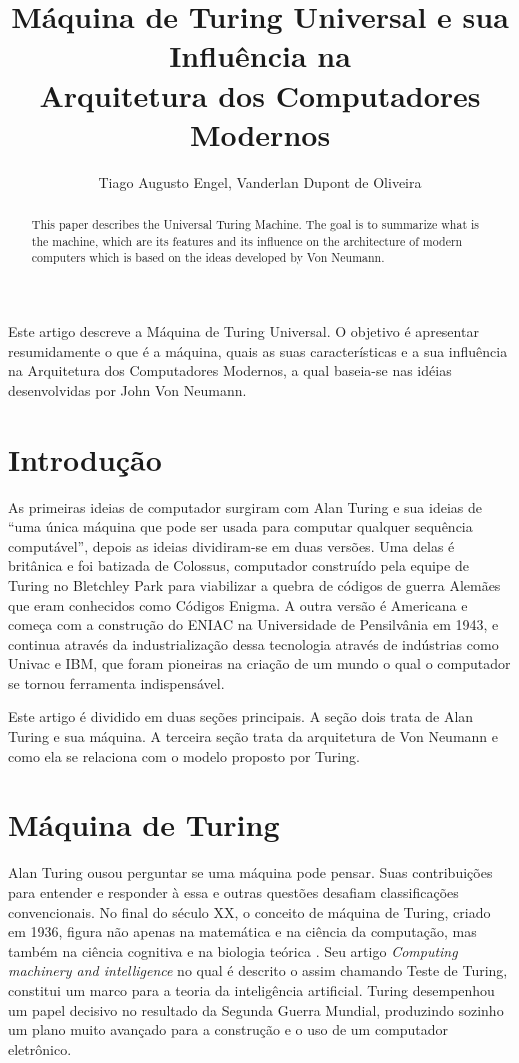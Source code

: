 \documentclass[12pt]{article}
\title{Máquina de Turing Universal e sua Influência na \\ Arquitetura dos Computadores Modernos \\}
\author{Tiago Augusto Engel\inst{1}, Vanderlan Dupont de Oliveira\inst{1}}
\begin{document}
 

\maketitle
\begin{resumo} 
 Este artigo descreve a Máquina de Turing Universal. O objetivo é apresentar resumidamente o que é a máquina, quais as suas características e a sua influência na Arquitetura dos Computadores Modernos, a qual baseia-se nas idéias desenvolvidas por John Von Neumann.
\end{resumo}

\begin{abstract}
This paper describes the Universal Turing Machine. The goal is to summarize what is the machine, which are its features and its influence on the architecture of modern computers which is based on the ideas developed by Von Neumann.
\end{abstract}
     

\section{Introdução}

As primeiras ideias de computador surgiram com Alan Turing e sua ideias de “uma única máquina que pode ser usada para computar qualquer sequência computável”, depois as ideias dividiram-se em duas versões. Uma delas é britânica e foi batizada de Colossus, computador construído pela equipe de Turing no Bletchley Park para viabilizar a quebra de códigos de guerra Alemães que eram conhecidos como Códigos Enigma. A outra versão é Americana e começa com a construção do ENIAC na Universidade de Pensilvânia em 1943, e continua através da industrialização dessa tecnologia através de indústrias como Univac e IBM, que foram pioneiras na criação de um mundo o qual o computador se tornou ferramenta indispensável.

Este artigo é dividido em duas seções principais. A seção dois trata de Alan Turing e sua máquina. A terceira seção trata da arquitetura de Von Neumann e como ela se relaciona com o modelo proposto por Turing.

\section{Máquina de Turing}

Alan Turing ousou perguntar se uma máquina pode pensar. Suas contribuições para entender e responder à essa e outras questões desafiam classificações convencionais. No final do século XX, o conceito de máquina de Turing, criado em 1936, figura não apenas na matemática e na ciência da computação, mas também na ciência cognitiva e na biologia teórica \cite{hodges1999}. Seu artigo \emph{Computing machinery and intelligence} \cite{Turing1950} no qual é descrito o assim chamando Teste de Turing, constitui um marco para a teoria da inteligência artificial. Turing desempenhou um papel decisivo no resultado da Segunda Guerra Mundial, produzindo sozinho um plano muito avançado para a construção e o uso de um computador eletrônico.
\end{document}
